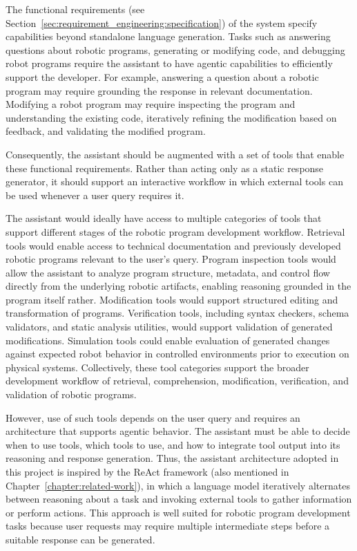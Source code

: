 The functional requirements (see Section~\ref{sec:requirement_engineering:specification}) of the system specify capabilities beyond standalone language generation. Tasks such as answering questions about robotic programs, generating or modifying code, and debugging robot programs require the assistant to have agentic capabilities to efficiently support the developer. For example, answering a question about a robotic program may require grounding the response in relevant documentation. Modifying a robot program may require inspecting the program and understanding the existing code, iteratively refining the modification based on feedback, and validating the modified program.

Consequently, the assistant should be augmented with a set of tools that enable these functional requirements. Rather than acting only as a static response generator, it should support an interactive workflow in which external tools can be used whenever a user query requires it.

The assistant would ideally have access to multiple categories of tools that support different stages of the robotic program development workflow. Retrieval tools would enable access to technical documentation and previously developed robotic programs relevant to the user's query. Program inspection tools would allow the assistant to analyze program structure, metadata, and control flow directly from the underlying robotic artifacts, enabling reasoning grounded in the program itself rather. Modification tools would support structured editing and transformation of programs. Verification tools, including syntax checkers, schema validators, and static analysis utilities, would support validation of generated modifications. Simulation tools could enable evaluation of generated changes against expected robot behavior in controlled environments prior to execution on physical systems. Collectively, these tool categories support the broader development workflow of retrieval, comprehension, modification, verification, and validation of robotic programs.

However, use of such tools depends on the user query and requires an architecture that supports agentic behavior. The assistant must be able to decide when to use tools, which tools to use, and how to integrate tool output into its reasoning and response generation. Thus, the assistant architecture adopted in this project is inspired by the ReAct framework (also mentioned in Chapter~\ref{chapter:related-work}), in which a language model iteratively alternates between reasoning about a task and invoking external tools to gather information or perform actions. This approach is well suited for robotic program development tasks because user requests may require multiple intermediate steps before a suitable response can be generated.


